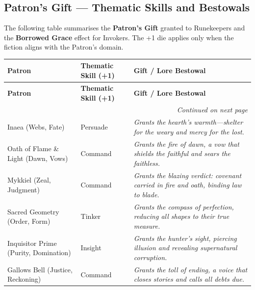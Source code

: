 \subsection{Patron's Gift --- Thematic Skills and Bestowals}
\label{subsec:gift-table}

The following table summarises the \textbf{Patron's Gift} granted to Runekeepers and the \textbf{Borrowed Grace} effect for Invokers. The +1 die applies only when the fiction aligns with the Patron's domain.

\renewcommand{\arraystretch}{1.15}
\setlength{\LTpre}{0.5em}
\setlength{\LTpost}{0.5em}

\begin{longtable}{@{}p{4.2cm}p{3.2cm}p{7.2cm}@{}}
  \toprule
  \textbf{Patron} & \textbf{Thematic Skill (+1)} & \textbf{Gift / Lore Bestowal} \\
  \midrule
  \endfirsthead
  
  \toprule
  \textbf{Patron} & \textbf{Thematic Skill (+1)} & \textbf{Gift / Lore Bestowal} \\
  \midrule
  \endhead
  
  \midrule
  \multicolumn{3}{r}{\emph{Continued on next page}} \\
  \bottomrule
  \endfoot
  
  \bottomrule
  \endlastfoot

  Inaea (Webs, Fate) & Persuade &
  \emph{Grants the hearth's warmth---shelter for the weary and mercy for the lost.} \\
  
  Oath of Flame \& Light (Dawn, Vows) & Command &
  \emph{Grants the fire of dawn, a vow that shields the faithful and sears the faithless.} \\
  
  Mykkiel (Zeal, Judgment) & Command &
  \emph{Grants the blazing verdict: covenant carried in fire and oath, binding law to blade.} \\
  
  Sacred Geometry (Order, Form) & Tinker &
  \emph{Grants the compass of perfection, reducing all shapes to their true measure.} \\
  
  Inquisitor Prime (Purity, Domination) & Insight &
  \emph{Grants the hunter's sight, piercing illusion and revealing supernatural corruption.} \\
  
  Gallows Bell (Justice, Reckoning) & Command &
  \emph{Grants the toll of ending, a voice that closes stories and calls all debts due.} \\
  

\end{longtable}
